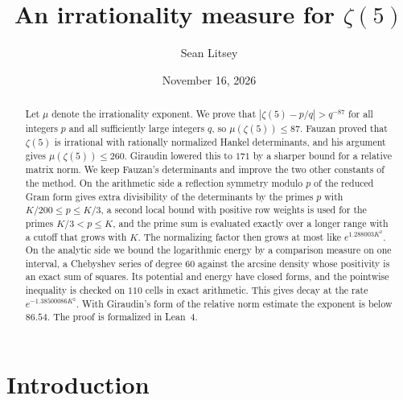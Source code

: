 \documentclass[11pt]{amsart}
\theoremstyle{definition}
\theoremstyle{remark}
\numberwithin{equation}{section}
\begin{document}
\title[An irrationality measure for $\zeta(5)$]{An irrationality measure for $\zeta(5)$}

\author{Sean Litsey}

\date{November 16, 2026}



\begin{abstract}
Let $\mu$ denote the irrationality exponent. We prove that $|\zeta(5)-p/q|>q^{-87}$ for all integers $p$ and all
sufficiently large integers $q$, so $\mu(\zeta(5))\le87$. Fauzan proved that $\zeta(5)$ is
irrational with rationally normalized Hankel determinants, and his argument gives $\mu(\zeta(5))\le260$.
Giraudin lowered this to $171$ by a sharper bound for a relative matrix norm. We keep Fauzan's determinants and
improve the two other constants of the method. On the arithmetic side a reflection symmetry modulo $p$ of the
reduced Gram form gives extra divisibility of the determinants by the primes $p$ with $K/200\le p\le K/3$, a
second local bound with positive row weights is used for the primes $K/3<p\le K$, and the prime sum is evaluated
exactly over a longer range with a cutoff that grows with $K$. The normalizing factor then grows at most like
$e^{1.288003K^2}$. On the analytic side we bound the logarithmic energy by a comparison measure on one interval,
a Chebyshev series of degree $60$ against the arcsine density whose positivity is an exact sum of squares. Its
potential and energy have closed forms, and the pointwise inequality is checked on $110$ cells in exact
arithmetic. This gives decay at the rate $e^{-1.38500086K^2}$. With Giraudin's form of the relative norm estimate
the exponent is below $86.54$. The proof is formalized in Lean~4.
\end{abstract}

\maketitle
\tableofcontents

\section{Introduction}\label{sec:intro}
\end{document}
